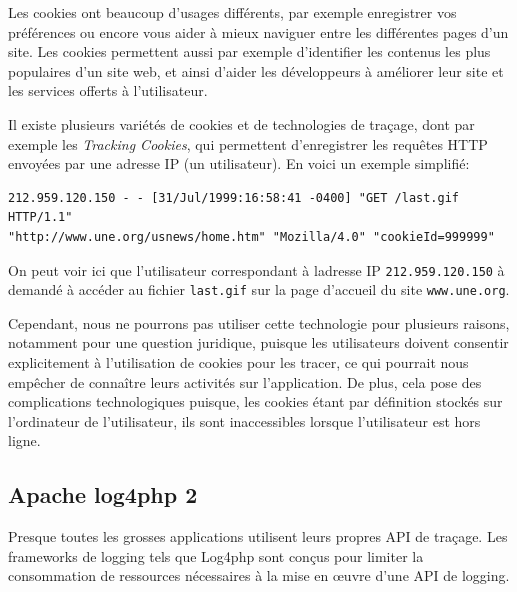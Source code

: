             Les cookies ont beaucoup d'usages différents, par exemple enregistrer vos préférences ou encore vous aider à mieux naviguer entre les différentes pages d'un site. Les cookies permettent aussi par exemple d'identifier les contenus les plus populaires d'un site web, et ainsi d'aider les développeurs à améliorer leur site et les services offerts à l'utilisateur.
            
            Il existe plusieurs variétés de cookies et de technologies de traçage, dont par exemple les \emph{Tracking Cookies}, qui permettent d'enregistrer les requêtes HTTP envoyées par une adresse IP (un utilisateur). En voici un exemple simplifié: 
{\small			
\begin{verbatim}            
212.959.120.150 - - [31/Jul/1999:16:58:41 -0400] "GET /last.gif HTTP/1.1"
"http://www.une.org/usnews/home.htm" "Mozilla/4.0" "cookieId=999999"
\end{verbatim}
}            
            
            On peut voir ici que l'utilisateur correspondant à ladresse IP \texttt{212.959.120.150} à demandé à accéder au fichier \texttt{last.gif} sur la page d'accueil du site \texttt{www.une.org}.
            
            Cependant, nous ne pourrons pas utiliser cette technologie pour plusieurs raisons, notamment pour une question juridique, puisque les utilisateurs doivent consentir explicitement à l'utilisation de cookies pour les tracer, ce qui pourrait nous empêcher de connaître leurs activités sur l'application. De plus, cela pose des complications technologiques puisque, les cookies étant par définition stockés sur l'ordinateur de l'utilisateur, ils sont inaccessibles lorsque l'utilisateur est hors ligne.
        
        \subsection{Apache log4php 2}
        
            Presque toutes les grosses applications utilisent leurs propres API de traçage. Les frameworks de logging tels que Log4php sont conçus pour limiter la consommation de ressources nécessaires à la mise en œuvre d'une API de logging.
% 
% 
%
            
